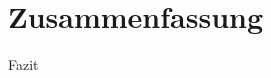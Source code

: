 \section{Zusammenfassung}
\begin{frame}{Fazit}
    \begin{alert}
        \blindtext
    \end{alert}
\end{frame}